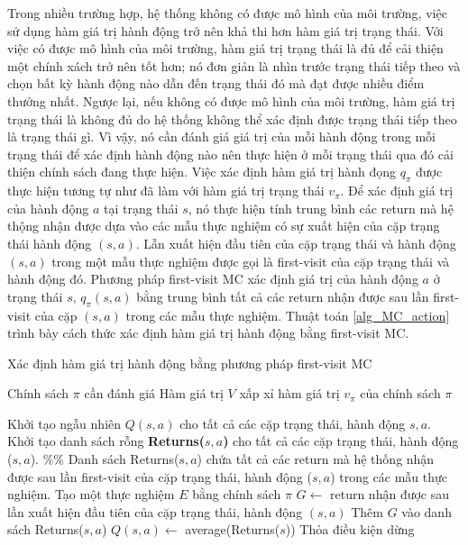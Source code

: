 Trong nhiều trường hợp, hệ thống không có được mô hình của môi trường, việc sử dụng hàm giá trị hành động trở nên khả thi hơn hàm giá trị trạng thái. Với việc có được mô hình của môi trường, hàm giá trị trạng thái là đủ để cải thiện một chính xách trở nên tốt hơn; nó đơn giản là nhìn trước trạng thái tiếp theo và chọn bất kỳ hành động nào dẫn đến trạng thái đó mà đạt được nhiều điểm thưởng nhất. Ngược lại, nếu không có được mô hình của môi trường, hàm giá trị trạng thái là không đủ do hệ thống không thể xác định được trạng thái tiếp theo là trạng thái gì. Vì vậy, nó cần đánh giá giá trị của mỗi hành động trong mỗi trạng thái để xác định hành động nào nên thực hiện ở mỗi trạng thái qua đó cải thiện chính sách đang thực hiện.
Việc xác định hàm giá trị hành đọng $q_{\pi}$ được thực hiện tương tự như đã làm với hàm giá trị trạng thái $v_{\pi}$. Để xác định giá trị của hành động $a$ tại trạng thái $s$, nó thực hiện tính trung bình các return mà hệ thộng nhận được dựa vào các mẫu thực nghiệm có sự xuất hiện của cặp trạng thái hành động $(s,a)$. Lẫn xuất hiện đầu tiên của cặp trạng thái và hành động $(s,a)$ trong một mẫu thực nghiệm được gọi là first-visit của cặp trạng thái và hành động đó. Phương pháp first-visit MC xác định giá trị của hành động $a$ ở trạng thái $s$, $q_{\pi}(s,a)$ bằng trung bình tất cả các return nhận được sau lần first-visit của cặp $(s,a)$ trong các mẫu thực nghiệm. Thuật toán \ref{alg_MC_action} trình bày cách thức xác định hàm giá trị hành động bằng first-visit MC.
\begin{algorithm}
	\caption{Xác định hàm giá trị hành động bằng phương pháp first-visit MC}
	\label{alg_MC_action}
	\begin{algorithmic}[1]
		\renewcommand{\algorithmicrequire}{\textbf{Đầu vào:}}
		\renewcommand{\algorithmicensure}{\textbf{Đầu ra:}}
		\algnewcommand{}
		\algnewcommand\Operation{\item[\algorithmicoperation]}
		
		\Require Chính sách $\pi$ cần đánh giá
		\Ensure Hàm giá trị $V$ xấp xỉ hàm giá trị $v_{\pi}$ của chính sách $\pi$
		
		\Operation
		\State Khởi tạo ngẫu nhiên $Q(s,a)$ cho tất cả các cặp trạng thái, hành động $s,a$.
		\State Khởi tạo danh sách rỗng \textbf{Returns($s,a$)} cho tất cả các cặp trạng thái, hành động ($s,a$). \%\% Danh sách Returns($s,a$) chứa tất cả các return mà hệ thống nhận được sau lần first-visit của cặp trạng thái, hành động ($s,a$) trong các mẫu thực nghiệm.
		\Repeat
		\State Tạo một thực nghiệm $E$ bằng chính sách $\pi$
		\State $G \leftarrow$ return nhận được sau lần xuất hiện đầu tiên của cặp trạng thái, hành động $(s,a)$
		\State Thêm $G$ vào danh sách Returns($s,a$)
		\State $Q(s,a) \leftarrow$ average(Returns($s$))
		\EndFor
		\Until Thỏa điều kiện dừng
	\end{algorithmic}
\end{algorithm}

